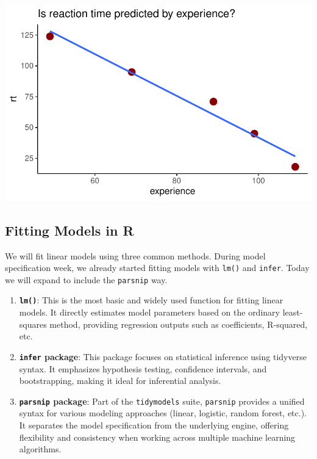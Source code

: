 \documentclass[
  letterpaper,
  DIV=11,
  numbers=noendperiod]{scrartcl}
\begin{document}
\includegraphics{model-fitting_files/figure-pdf/unnamed-chunk-2-1.pdf}

\subsection{Fitting Models in R}\label{fitting-models-in-r}

We will fit linear models using three common methods. During model
specification week, we already started fitting models with \texttt{lm()}
and \texttt{infer}. Today we will expand to include the \texttt{parsnip}
way.

\begin{enumerate}
\def\labelenumi{\arabic{enumi}.}
\item
  \textbf{\texttt{lm()}}: This is the most basic and widely used
  function for fitting linear models. It directly estimates model
  parameters based on the ordinary least-squares method, providing
  regression outputs such as coefficients, R-squared, etc.
\item
  \textbf{\texttt{infer} package}: This package focuses on statistical
  inference using tidyverse syntax. It emphasizes hypothesis testing,
  confidence intervals, and bootstrapping, making it ideal for
  inferential analysis.
\item
  \textbf{\texttt{parsnip} package}: Part of the \texttt{tidymodels}
  suite, \texttt{parsnip} provides a unified syntax for various modeling
  approaches (linear, logistic, random forest, etc.). It separates the
  model specification from the underlying engine, offering flexibility
  and consistency when working across multiple machine learning
  algorithms.
\end{enumerate}
\end{document}
